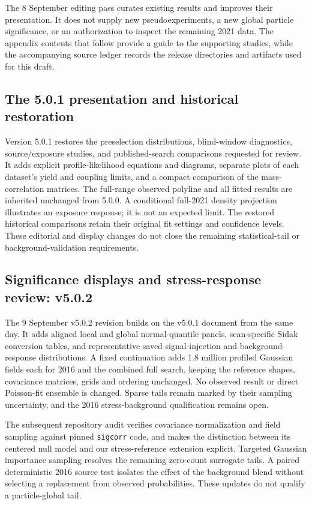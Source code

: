 The 8 September editing pass curates existing results and improves their
presentation. It does not supply new pseudoexperiments, a new global
particle significance, or an authorization to inspect the remaining
2021 data. The appendix contents that follow provide a guide to the
supporting studies, while the accompanying source ledger records the
release directories and artifacts used for this draft.

\subsection{The 5.0.1 presentation and historical restoration}
Version 5.0.1 restores the preselection distributions, blind-window diagnostics,
source/exposure studies, and published-search comparisons requested for review.
It adds explicit profile-likelihood equations and diagrams, separate plots of
each dataset's yield and coupling limits, and a compact comparison of the
mass-correlation matrices. The full-range observed polyline and all fitted
results are inherited unchanged from 5.0.0. A conditional full-2021 density
projection illustrates an exposure response; it is not an expected limit.
The restored historical comparisons retain their original fit settings and
confidence levels. These editorial and display changes do not close the
remaining statistical-tail or background-validation requirements.

\subsection{Significance displays and stress-response review: v5.0.2}
The 9 September v5.0.2 revision builds on the v5.0.1 document from the same
day. It adds aligned local and global normal-quantile panels, scan-specific
Sidak conversion tables, and representative saved signal-injection and
background-response distributions. A fixed continuation adds 1.8 million
profiled Gaussian fields each for 2016 and the combined full search, keeping
the reference shapes, covariance matrices, grids and ordering unchanged.
No observed result or direct Poisson-fit ensemble is changed. Sparse tails
remain marked by their sampling uncertainty, and the 2016 stress-background
qualification remains open.

The subsequent repository audit verifies covariance normalization and field
sampling against pinned \texttt{sigcorr} code, and makes the distinction
between its centered null model and our stress-reference extension explicit.
Targeted Gaussian importance sampling resolves the remaining zero-count
surrogate tails. A paired deterministic 2016 source test isolates the effect
of the background blend without selecting a replacement from observed
probabilities. These updates do not qualify a particle-global tail.


